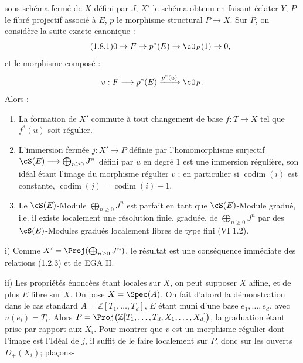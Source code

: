 sous-schéma fermé de \(X\) défini par \(J\), \(X'\) le schéma obtenu en faisant éclater \(Y\), \(P\) le fibré projectif associé à \(E\), \(p\) le morphisme structural \(P\to X\). Sur \(P\), on considère la suite exacte canonique :
\begin{equation}\tag{1.8.1}
0\to F\to p^*(E)\to\cO_P(1)\to0,
\end{equation}
et le morphisme composé :
\[
 v:F\longrightarrow p^*(E)\xrightarrow{p^*(u)}\cO_P .
\]
Alors :
\begin{enumerate}[label=\roman*)]
\item La formation de \(X'\) commute à tout changement de base \(f:T\to X\) tel que \(f^*(u)\) soit régulier.
\item L'immersion fermée \(j:X'\to P\) définie par l'homomorphisme surjectif \(\cS(E)\longrightarrow\bigoplus_{n\ge0}J^n\) défini par \(u\) en degré \(1\) est une immersion régulière, son idéal étant l'image du morphisme régulier \(v\) ; en particulier si \(\operatorname{codim}(i)\) est constante, \(\operatorname{codim}(j)=\operatorname{codim}(i)-1\).
\item Le \(\cS(E)\)-Module \(\bigoplus_{n\ge0}J^n\) est parfait en tant que \(\cS(E)\)-Module gradué, i.e. il existe localement une résolution finie, graduée, de \(\bigoplus_{n\ge0}J^n\) par des \(\cS(E)\)-Modules gradués localement libres de type fini (VI 1.2).
\end{enumerate}

i) Comme \(X'=\Proj(\bigoplus_{n\ge0}J^n)\), le résultat est une conséquence immédiate des relations (1.2.3) et de EGA II.

ii) Les propriétés énoncées étant locales sur \(X\), on peut supposer \(X\) affine, et de plus \(E\) libre sur \(X\). On pose \(X=\Spec(A)\). On fait d'abord la démonstration dans le cas standard \(A=\mathbb Z[T_1,\ldots,T_d]\), \(E\) étant muni d'une base \(e_1,\ldots,e_d\), avec \(u(e_i)=T_i\). Alors \(P=\Proj\bigl(\mathbb Z[T_1,\ldots,T_d,X_1,\ldots,X_d]\bigr)\), la graduation étant prise par rapport aux \(X_i\). Pour montrer que \(v\) est un morphisme régulier dont l'image est l'Idéal de \(j\), il suffit de le faire localement sur \(P\), donc sur les ouverts \(D_+(X_i)\); plaçons-
